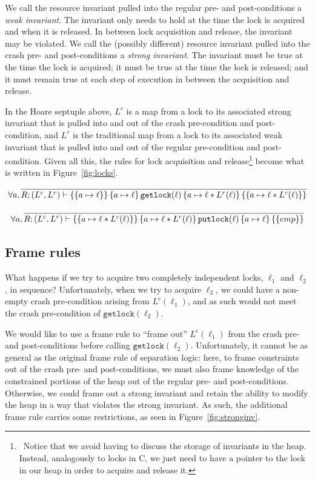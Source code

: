 We call the resource invariant pulled into the regular pre- and post-conditions
a \textit{weak invariant}.
The invariant only needs to hold at the time the lock
is acquired and when it is released.
In between lock acquisition and release,
the invariant may be violated.
We call the (possibly different) resource
invariant pulled into the crash pre- and post-conditions a \textit{strong
invariant}.
The invariant must be true at the time the lock is acquired; it must
be true at the time the lock is released; and it must remain true at each step
of execution in between the acquisition and release.

In the Hoare septuple above, $L^c$ is a map from a lock to its associated strong
invariant that is pulled into and out of the crash pre-condition and
post-condition, and $L^r$ is the traditional map from a lock to its associated
weak invariant that is pulled into and out of the regular pre-condition and
post-condition.
Given all this, the rules for lock acquisition and release\footnote{\
Notice that we avoid
having to discuss the storage of invariants in the heap.
Instead, analogously
to locks in C, we just need to have a pointer to the lock in our heap in order
to acquire and release it.}
become what is written in Figure~\ref{fig:locks}.

\begin{figure*}
\begin{gather*}
    \forall a, \infer{\hoarestmt{R}{(L^c,L^r)}{a \mapsto \ell}{a \mapsto \ell}{\texttt{getlock}(\ell)}{a \mapsto \ell *
    L^r(\ell)}{a \mapsto \ell * L^c(\ell)}}{} \\[+9px]
    \forall a, \infer{\hoarestmt{R}{(L^c,L^r)}{a \mapsto \ell * L^c(\ell)}{a \mapsto \ell *
    L^r(\ell)}{\texttt{putlock}(\ell)}{a \mapsto \ell}{emp}}{}
\end{gather*}
\caption{Rules for getlock and putlock}
\label{fig:locks}
\end{figure*}

\subsection{Frame rules}

What happens if we try to acquire two completely independent locks, $\ell_1$ and
$\ell_2$, in sequence? Unfortunately, when we try to acquire $\ell_2$, we could
have a non-empty crash pre-condition arising from $L^c(\ell_1)$, and as such
would not meet the crash pre-condition of $\texttt{getlock}(\ell_2)$.

We would like to use a frame rule to ``frame out'' $L^c(\ell_1)$ from the crash
pre- and post-conditions before calling $\texttt{getlock}(\ell_2)$.
Unfortunately, it cannot be as general as the original frame rule of separation
logic: here, to frame constraints out of the crash pre- and post-conditions, we
must also frame knowledge of the constrained portions of the heap out of the
regular pre- and post-conditions.
Otherwise, we could frame out a strong
invariant and retain the ability to modify the heap in a way that violates the
strong invariant.
As such, the additional frame rule carries some restrictions,
as seen in Figure~\ref{fig:stronginv}.

